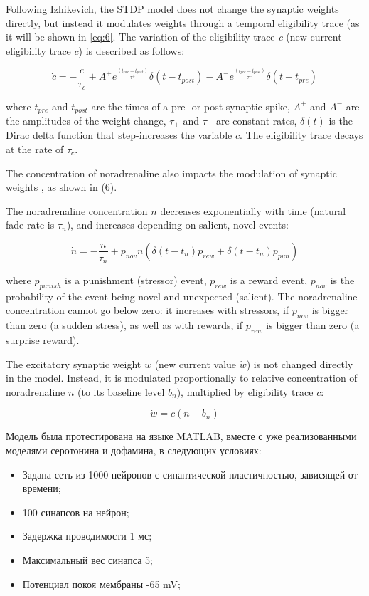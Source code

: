 Following Izhikevich, the STDP model \cite{stdp} does not change the synaptic weights directly, but instead it modulates weights through a temporal eligibility trace (as it will be shown in \ref{eq:6}. 
The variation of the eligibility trace \textit{c} (new current eligibility trace $\dot{c}$) is described as follows: 


\begin{equation}\label{eq:4}
\dot{c} =  -\frac{c}{\tau_c} + A^+e^{\frac{(t_{pre} - t_{post})}{\tau^+}}\delta(t - t_{post})  -A^-e^{  \frac{(t_{pre} - t_{post})}{\tau^-}}\delta(t - t_{pre} )
\end{equation}


where $t_{pre}$ and $t_{post}$ are the times of a pre- or post-synaptic spike, $A^+$ and $A^-$ are the amplitudes of the weight change, $\tau_+$ and $\tau_-$ are constant rates, $\delta(t)$ is  the Dirac delta function that step-increases the variable $c$. 
The eligibility trace decays at the rate of $\tau_c$. 


The concentration of noradrenaline also impacts the modulation of synaptic weights \cite{nora1}\cite{nora2}, as shown in (6).

The noradrenaline concentration $n$ decreases exponentially with time (natural fade rate is $\tau_n$), and increases depending on salient, novel events: 


\begin{equation}\label{eq:5}
\dot{n} = -\frac{n}{\tau_n} + p_{nov}n (\delta(t - t_n)p_{rew} + \delta(t - t_n)p_{pun})
\end{equation}


where $p_{punish}$ is a punishment (stressor) event, $p_{rew}$ is a reward event, $p_{nov}$ is the probability of the event being novel and unexpected (salient). 
The noradrenaline concentration cannot go below zero: it increases with stressors, if $p_{nov}$ is bigger than zero (a sudden stress), as well as with rewards, if $p_{rew}$ is bigger than zero (a surprise reward). 

The excitatory synaptic weight $w$ (new current value $\dot{w}$) is not changed directly in the model. Instead, it is modulated proportionally to relative concentration of noradrenaline $n$ (to its baseline level $b_n$), multiplied by eligibility trace $c$: 

\begin{equation}\label{eq:6}
\dot{w} = c(n - b_n)
\end{equation}

Модель была протестирована на языке MATLAB, вместе с уже реализованными моделями серотонина и дофамина, в следующих условиях:
\begin{itemize}
\item Задана сеть из 1000 нейронов с синаптической пластичностью, зависящей от времени;
\item 100 синапсов на нейрон;
\item Задержка проводимости 1 мс;
\item Максимальный вес синапса 5;
\item Потенциал покоя мембраны -65 mV;
\end{itemize}

